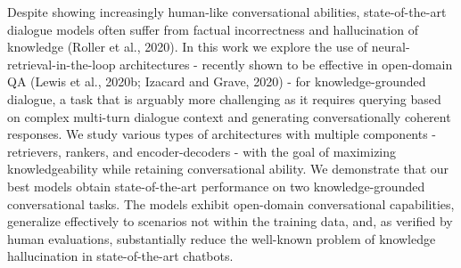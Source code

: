 Despite showing increasingly human-like conversational abilities, state-of-the-art dialogue models often suffer from factual incorrectness and hallucination of knowledge (Roller et al., 2020). In this work we explore the use of neural-retrieval-in-the-loop architectures - recently shown to be effective in open-domain QA (Lewis et al., 2020b; Izacard and Grave, 2020) - for knowledge-grounded dialogue, a task that is arguably more challenging as it requires querying based on complex multi-turn dialogue context and generating conversationally coherent responses. We study various types of architectures with multiple components - retrievers, rankers, and encoder-decoders - with the goal of maximizing knowledgeability while retaining conversational ability. We demonstrate that our best models obtain state-of-the-art performance on two knowledge-grounded conversational tasks. The models exhibit open-domain conversational capabilities, generalize effectively to scenarios not within the training data, and, as verified by human evaluations, substantially reduce the well-known problem of knowledge hallucination in state-of-the-art chatbots.
